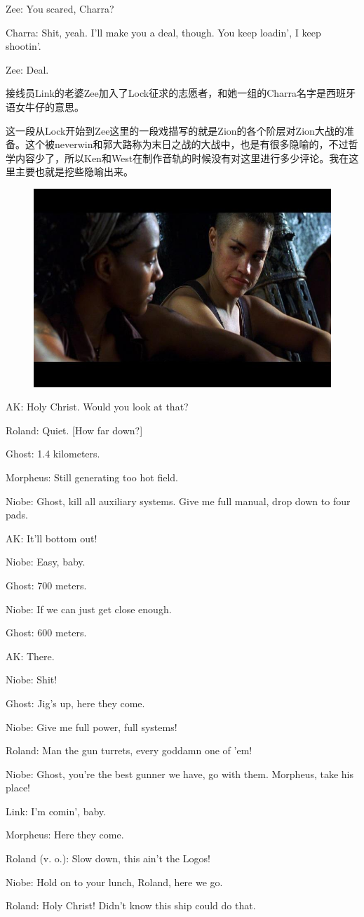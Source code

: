\documentclass[UTF8]{ctexart}
\newenvironment{myquote}{\color{green} \setlength{\leftskip}{6em} \setlength{\rightskip}{4em} \setlength{\parindent}{-2em}}{\par}
\begin{document}
\begin{myquote}
Zee: You scared, Charra?

Charra: Shit, yeah. I'll make you a deal, though. You keep loadin', I keep shootin'.

Zee: Deal.
\end{myquote}

接线员Link的老婆Zee加入了Lock征求的志愿者，和她一组的Charra名字是西班牙语女牛仔的意思。

这一段从Lock开始到Zee这里的一段戏描写的就是Zion的各个阶层对Zion大战的准备。这个被neverwin和郭大路称为末日之战的大战中，也是有很多隐喻的，不过哲学内容少了，所以Ken和West在制作音轨的时候没有对这里进行多少评论。我在这里主要也就是挖些隐喻出来。

\begin{figure}[htb]
\centering
\includegraphics[width=0.5\linewidth]{fig/27d5d1a236c79aadcbefd0f2.jpg}
\end{figure}

\begin{myquote}
AK: Holy Christ. Would you look at that?

Roland: Quiet. [How far down?]

Ghost: 1.4 kilometers.

Morpheus: Still generating too hot field.

Niobe: Ghost, kill all auxiliary systems. Give me full manual, drop down to four pads.

AK: It'll bottom out!

Niobe: Easy, baby.

Ghost: 700 meters.

Niobe: If we can just get close enough.

Ghost: 600 meters.

AK: There.

Niobe: Shit!

Ghost: Jig's up, here they come.

Niobe: Give me full power, full systems!

Roland: Man the gun turrets, every goddamn one of 'em!

Niobe: Ghost, you're the best gunner we have, go with them. Morpheus, take his place!

Link: I'm comin', baby.

Morpheus: Here they come.

Roland (v. o.): Slow down, this ain't the Logos!

Niobe: Hold on to your lunch, Roland, here we go.

Roland: Holy Christ! Didn't know this ship could do that.
\end{myquote}
\end{document}
